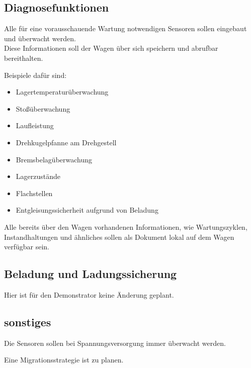 \subsection{Diagnosefunktionen}
\begin{feat}
Alle für eine vorausschauende Wartung notwendigen Sensoren sollen eingebaut und überwacht werden.\\
Diese Informationen soll der Wagen über sich speichern und abrufbar bereithalten.
\end{feat}
\begin{rem}
Beispiele dafür sind:
\begin{itemize}
    \item Lagertemperaturüberwachung
    \item Stoßüberwachung
    \item Laufleistung
    \item Drehkugelpfanne am Drehgestell
    \item Bremsbelagüberwachung
    \item Lagerzustände
    \item Flachstellen
    \item Entgleisungssicherheit aufgrund von Beladung
\end{itemize}
\end{rem}
\begin{feat}
Alle bereits über den Wagen vorhandenen Informationen, wie Wartungszyklen, Instandhaltungen und ähnliches sollen als Dokument lokal auf dem Wagen  verfügbar sein.
\end{feat}

\subsection{Beladung und Ladungssicherung}
Hier ist für den Demonstrator keine Änderung geplant.

\subsection{sonstiges}
\begin{feat}
Die Sensoren sollen bei Spannungsversorgung immer überwacht werden.
\end{feat}
\begin{feat}
Eine Migrationsstrategie ist zu planen.
\end{feat}